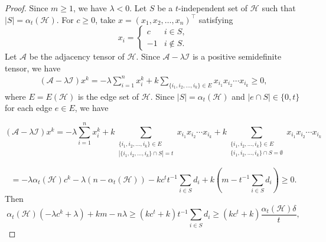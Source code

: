 \documentclass[10pt,a4paper]{amsart}
\begin{document}
\begin{proof}
Since $m\geq1$, we have $\lambda<0$. Let $S$ be a $t$-independent set of $\mathcal{H}$ such that $|S|=\alpha_t(\mathcal{H})$. For $c\geq0$, take $x=(x_1,x_2,\ldots,x_n)^\top$ satisfying
$${x_i} =
\begin{cases}
c & i \in S,\\
- 1 & i \notin S.
\end{cases}
$$
Let $\mathcal{A}$ be the adjacency tensor of $\mathcal{H}$. Since $\mathcal{A}-\lambda \mathcal{I}$ is a positive semidefinite tensor, we have
\begin{eqnarray*}
(\mathcal{A}-\lambda \mathcal{I})x^k=-\lambda\sum_{i=1}^nx_i^{k}+k\sum_{\{ i_1,i_2,\ldots,i_k\}\in E}x_{i_1}x_{i_2}\cdots x_{i_k}\geq0,
\end{eqnarray*}
where $E=E(\mathcal{H})$ is the edge set of $\mathcal{H}$.
Since $|S|=\alpha_t(\mathcal{H})$ and $|e\cap S|\in\{0,t\}$ for each edge $e\in E$, we have

\[( {\mathcal{A}}-\lambda \mathcal{I} )x^k = -\lambda\sum_{i=1}^nx_i^k  +k
 \sum_{\substack{\{i_1,i_2,\ldots,i_k\}\in E\\ |\{i_1,i_2,\ldots,i_k\}\cap S|=t}}
{{x_{{i_1}}}{x_{{i_2}}} \cdots {x_{{i_k}}}}  +k
\sum_{\substack{\{i_1,i_2,\ldots,i_k\} \in E\\ \{i_1,i_2,\ldots,i_k\} \cap S = \emptyset}} {{x_{{i_1}}}{x_{{i_2}}} \cdots {x_{{i_k}}}} \]


\[= - {\lambda} \alpha_{t}(\mathcal{H}) {c^k} - \lambda (n - {\alpha_{t}}(\mathcal{H}) ) - kc^tt^{-1}\sum_{i\in S}d_i+ k\left( {m - t^{-1}\sum_{i\in S}d_i}\right) \geqslant 0.\]
Then
\[{\alpha _t}(\mathcal{H})\left( {-\lambda {c^k} + \lambda } \right) + km -n \lambda  \geqslant \left( {k{c^t} + k} \right)t^{-1}\sum_{i\in S}d_i \geqslant \left( {k{c^t} + k} \right)\frac{{{\alpha _t}(\mathcal{H})\delta }}{t},\]


\end{proof}
\end{document}
